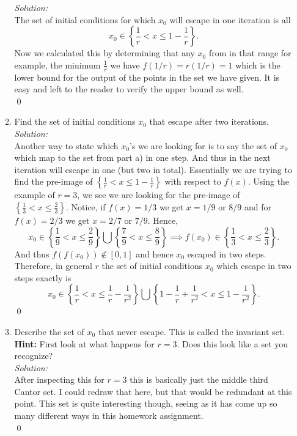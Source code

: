 \documentclass[10pt]{amsart}
\theoremstyle{nonumberplain}
\begin{document}
\begin{enumerate}[label={\bf {\arabic*}:}]
\begin{enumerate}
\textit{Solution:} \\
The set of initial conditions for which $x_0$ will escape in one iteration is all
$$
x_0 \in \left\{\frac 1 r < x \leq 1 - \frac 1 r \right\}.
$$
Now we calculated this by determining that any $x_0$ from in that range for example, the minimum $\frac 1 r$ we have $f(1/r) = r(1/r) = 1$ which is the lower bound for the output of the points in the set we have given.
It is easy and left to the reader to verify the upper bound as well. \\
\qed \\

\item Find the set of initial conditions $x_0$ that escape after two iterations. \\

\textit{Solution:} \\
Another way to state which $x_0$'s we are looking for is to say the set of $x_0$ which map to the set from part a) in one step.
And thus in the next iteration will escape in one (but two in total).
Essentially we are trying to find the pre-image of $\left\{\frac 1 r < x \leq 1 - \frac 1 r \right\}$ with respect to $f(x)$.
Using the example of $r = 3$, we see we are looking for the pre-image of $\left\{\frac 1 3 < x \leq \frac 2 3 \right\}$.
Notice, if $f(x) = 1/3$ we get $x = 1/9 \text{ or } 8/9$ and for $f(x) = 2/3$ we get $x = 2/7 \text{ or } 7/9$.
Hence,
$$
x_0 \in \left\{\frac 1 9 < x \leq \frac 2 9 \right\} \bigcup \left\{\frac 7 9 < x \leq \frac 8 9 \right\}
\implies
f(x_0) \in \left\{\frac 1 3 < x \leq \frac 2 3 \right\}.
$$
And thus $f(f(x_0)) \not \in [0, 1]$ and hence $x_0$ escaped in two steps.
Therefore, in general $r$ the set of initial conditions $x_0$ which escape in two steps exactly is
$$
x_0 \in \left\{\frac 1 r < x \leq \frac 1 r - \frac 1 {r^2} \right\}
\bigcup \left\{1 - \frac 1 r + \frac 1 {r^2} < x \leq 1- \frac 1 {r^2} \right\}.
$$
\qed \\


\item Describe the set of $x_0$ that never escape.
This is called the invariant set. \\
\textbf{Hint:} First look at what happens for $r = 3$.
Does this look like a set you recognize? \\

\textit{Solution:} \\
After inspecting this for $r = 3$ this is basically just the middle third Cantor set.
I could redraw that here, but that would be redundant at this point.
This set is quite interesting though, seeing as it has come up so many different ways in this homework assignment. \\
\qed \\


\end{enumerate}
\end{enumerate}
\end{document}
